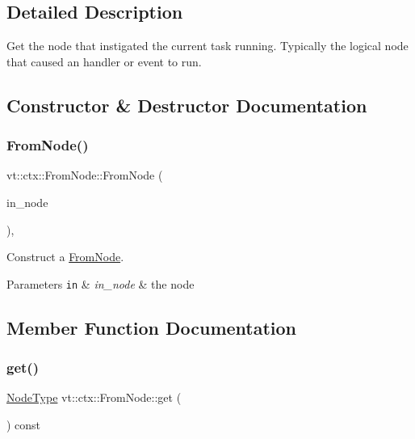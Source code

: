 \subsection{Detailed Description}
Get the node that instigated the current task running. Typically the logical node that caused an handler or event to run. 

\subsection{Constructor \& Destructor Documentation}
\mbox{\label{structvt_1_1ctx_1_1_from_node_a67580fa04255325197b1b03c96f505a8}} 
\subsubsection{\texorpdfstring{From\+Node()}{FromNode()}}
{\footnotesize\ttfamily vt\+::ctx\+::\+From\+Node\+::\+From\+Node (\begin{DoxyParamCaption}\item[{\hyperlink{namespacevt_a866da9d0efc19c0a1ce79e9e492f47e2}{Node\+Type} const}]{in\+\_\+node }\end{DoxyParamCaption})\hspace{0.3cm}{\ttfamily [inline]}, {\ttfamily [explicit]}}



Construct a {\ttfamily \hyperlink{structvt_1_1ctx_1_1_from_node}{From\+Node}}. 


\begin{DoxyParams}[1]{Parameters}
\mbox{\tt in}  & {\em in\+\_\+node} & the node \\
\hline
\end{DoxyParams}


\subsection{Member Function Documentation}
\mbox{\label{structvt_1_1ctx_1_1_from_node_a71ad37247833401a025fd3efa05e5d32}} 
\subsubsection{\texorpdfstring{get()}{get()}}
{\footnotesize\ttfamily \hyperlink{namespacevt_a866da9d0efc19c0a1ce79e9e492f47e2}{Node\+Type} vt\+::ctx\+::\+From\+Node\+::get (\begin{DoxyParamCaption}{ }\end{DoxyParamCaption}) const\hspace{0.3cm}{\ttfamily [inline]}}



